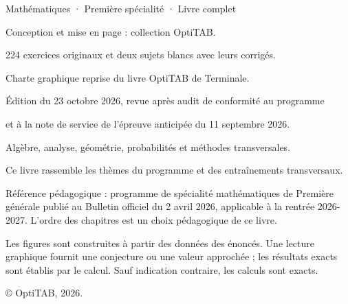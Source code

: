 \thispagestyle{empty}
\vspace*{\fill}
\begin{minipage}{128mm}
\fontsize{9}{13}\selectfont\color{otMuted}
{\otSemi\color{otInk}Mathématiques · Première spécialité · Livre complet}\par
\vspace{3mm}
Conception et mise en page : collection OptiTAB.\par
224 exercices originaux et deux sujets blancs avec leurs corrigés.\par
Charte graphique reprise du livre OptiTAB de Terminale.\par
\vspace{5mm}
Édition du 23 octobre 2026, revue après audit de conformité au programme\par
et à la note de service de l'épreuve anticipée du 11 septembre 2026.\par
Algèbre, analyse, géométrie, probabilités et méthodes transversales.\par
Ce livre rassemble les thèmes du programme et des entraînements transversaux.\par
\vspace{5mm}
Référence pédagogique : programme de spécialité mathématiques de Première
générale publié au Bulletin officiel du 2 avril 2026, applicable à la rentrée
2026-2027. L'ordre des chapitres est un choix pédagogique de ce livre.\par
\vspace{5mm}
Les figures sont construites à partir des données des énoncés. Une lecture
graphique fournit une conjecture ou une valeur approchée ; les résultats exacts
sont établis par le calcul. Sauf indication contraire, les calculs sont exacts.\par
\vspace{5mm}
© OptiTAB, 2026.\par
\otSite
\end{minipage}
\clearpage
